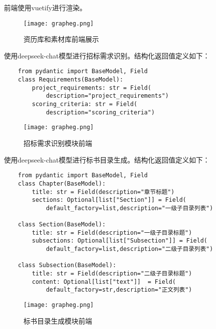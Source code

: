 \documentclass{xmu}
\begin{document}
    前端使用vuetify进行渲染。
    \begin{figure}[!htb]
        \centering
        \texttt{[image: grapheg.png]}\\
        \caption{资历库和素材库前端展示
        }\label{frontend}
    \end{figure}

    使用deepseek-chat模型进行招标需求识别。结构化返回值定义如下：
    \begin{verbatim}
    from pydantic import BaseModel, Field
    class Requirements(BaseModel):
        project_requirements: str = Field(
            description="project_requirements")
        scoring_criteria: str = Field(
            description="scoring_criteria")
    \end{verbatim}

    \begin{figure}[!htb]
        \centering
        \texttt{[image: grapheg.png]}\\
        \caption{招标需求识别模块前端
        }\label{requirements}
    \end{figure}

    使用deepseek-chat模型进行标书目录生成。结构化返回值定义如下：
    \begin{verbatim}
    from pydantic import BaseModel, Field
    class Chapter(BaseModel):
        title: str = Field(description="章节标题")
        sections: Optional[list["Section"]] = Field(
            default_factory=list,description="一级子目录列表")
    
    class Section(BaseModel):
        title: str = Field(description="一级子目录标题")
        subsections: Optional[list["Subsection"]] = Field(
            default_factory=list,description="二级子目录列表")
        
    class Subsection(BaseModel):
        title: str = Field(description="二级子目录标题")
        content: Optional[list["text"]]  = Field(
            default_factory=str,description="正文列表")
    \end{verbatim}

    \begin{figure}[!htb]
        \centering
        \texttt{[image: grapheg.png]}\\
        \caption{标书目录生成模块前端
        }\label{mulu}
    \end{figure}
\end{document}
